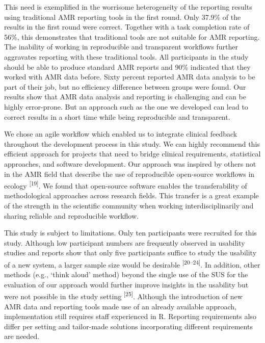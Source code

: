 \documentclass[
]{book}
\begin{document}
This need is exemplified in the worrisome heterogeneity of the reporting results using traditional AMR reporting tools in the first round. Only 37.9\% of the results in the first round were correct. Together with a task completion rate of 56\%, this demonstrates that traditional tools are not suitable for AMR reporting. The inability of working in reproducible and transparent workflows further aggravates reporting with these traditional tools. All participants in the study should be able to produce standard AMR reports and 90\% indicated that they worked with AMR data before. Sixty percent reported AMR data analysis to be part of their job, but no efficiency difference between groups were found. Our results show that AMR data analysis and reporting is challenging and can be highly error-prone. But an approach such as the one we developed can lead to correct results in a short time while being reproducible and transparent.

We chose an agile workflow which enabled us to integrate clinical feedback throughout the development process in this study. We can highly recommend this efficient approach for projects that need to bridge clinical requirements, statistical approaches, and software development. Our approach was inspired by others not in the AMR field that describe the use of reproducible open-source workflows in ecology \textsuperscript{{[}19{]}}. We found that open-source software enables the transferability of methodological approaches across research fields. This transfer is a great example of the strength in the scientific community when working interdisciplinarily and sharing reliable and reproducible workflow.

This study is subject to limitations. Only ten participants were recruited for this study. Although low participant numbers are frequently observed in usability studies and reports show that only five participants suffice to study the usability of a new system, a larger sample size would be desirable \textsuperscript{{[}20--24{]}}. In addition, other methods (e.g., `think aloud' method) beyond the single use of the SUS for the evaluation of our approach would further improve insights in the usability but were not possible in the study setting \textsuperscript{{[}25{]}}. Although the introduction of new AMR data and reporting tools made use of an already available approach, implementation still requires staff experienced in R. Reporting requirements also differ per setting and tailor-made solutions incorporating different requirements are needed.
\end{document}
